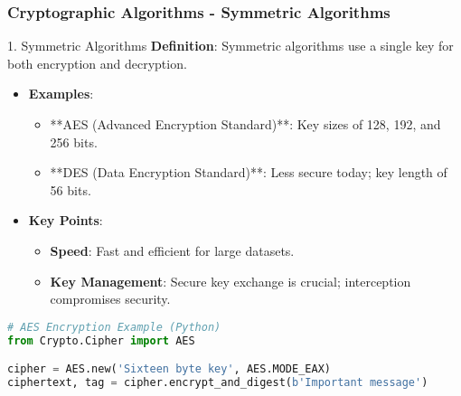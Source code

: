 \documentclass{beamer}
\begin{document}
\begin{frame}[fragile]
    \frametitle{Cryptographic Algorithms - Symmetric Algorithms}
    \begin{block}{1. Symmetric Algorithms}
        \textbf{Definition}: Symmetric algorithms use a single key for both encryption and decryption.
        
        \begin{itemize}
            \item \textbf{Examples}: 
            \begin{itemize}
                \item **AES (Advanced Encryption Standard)**: Key sizes of 128, 192, and 256 bits.
                \item **DES (Data Encryption Standard)**: Less secure today; key length of 56 bits.
            \end{itemize}
            \item \textbf{Key Points}:
            \begin{itemize}
                \item \textbf{Speed}: Fast and efficient for large datasets.
                \item \textbf{Key Management}: Secure key exchange is crucial; interception compromises security.
            \end{itemize}
        \end{itemize}
    \end{block}
    \begin{lstlisting}[language=Python]
# AES Encryption Example (Python)
from Crypto.Cipher import AES

cipher = AES.new('Sixteen byte key', AES.MODE_EAX)
ciphertext, tag = cipher.encrypt_and_digest(b'Important message')
    \end{lstlisting}
\end{frame}
\end{document}
